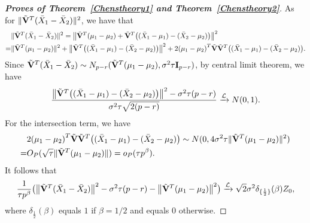 \documentclass[review]{elsarticle}
\theoremstyle{plain}
\theoremstyle{definition}
\theoremstyle{remark}
\begin{document}
\begin{proof}[\textbf{Proves of Theorem~\ref{Chenstheory1} and Theorem~\ref{Chenstheory2}}]
    As for $\|\tilde{\mathbf{V}}^T(\bar{X}_1-\bar{X}_2)\|^2$, we have that
        $$
        \begin{aligned}
            &\|\tilde{\mathbf{V}}^T(\bar{X}_1-\bar{X}_2)\|^2
            =\big\|\tilde{\mathbf{V}}^T(\mu_1-\mu_2)+\tilde{\mathbf{V}}^T\big((\bar{X}_1-\mu_1)-(\bar{X}_2-\mu_2)\big)\big\|^2\\
            =&\|\tilde{\mathbf{V}}^T(\mu_1-\mu_2)\|^2+
            \big\|\tilde{\mathbf{V}}^T\big((\bar{X}_1-\mu_1)-(\bar{X}_2-\mu_2)\big)\big\|^2+
            2{(\mu_1-\mu_2)}^T\tilde{\mathbf{V}}\tilde{\mathbf{V}}^T\big((\bar{X}_1-\mu_1)-(\bar{X}_2-\mu_2)\big).
        \end{aligned}
        $$
Since $\tilde{\mathbf{V}}^T (\bar{X}_1-\bar{X}_2)\sim N_{p-r}(\tilde{\mathbf{V}}^T (\mu_1-\mu_2),  \sigma^2 \tau \mathbf{I}_{p-r})$, by central limit theorem, we have
    $$
\frac{
    \big\|\tilde{\mathbf{V}}^T\big((\bar{X}_1-\mu_1)-(\bar{X}_2-\mu_2)\big)\big\|^2-\sigma^2 \tau (p-r)}{\sigma^2 \tau\sqrt{2(p-r)}}\xrightarrow{\mathcal{L}} N(0,1).
    $$
    For the intersection term, we have
    \begin{equation*}
        \begin{aligned}
            &2{(\mu_1-\mu_2)}^T\tilde{\mathbf{V}}\tilde{\mathbf{V}}^T\big((\bar{X}_1-\mu_1)-(\bar{X}_2-\mu_2)\big)
            \sim N(0,4\sigma^2 \tau \|\tilde{\mathbf{V}}^T(\mu_1-\mu_2)\|^2)\\
            =& O_P(\sqrt{\tau}\|\tilde{\mathbf{V}}^T(\mu_1-\mu_2)\| )=o_P(\tau p^{\beta}).
        \end{aligned}
    \end{equation*}
    It follows that
    \begin{equation}\label{eq:kkk3}
\frac{1}{\tau p^\beta}
    \big(\big\|\tilde{\mathbf{V}}^T(\bar{X}_1-\bar{X}_2)\big\|^2-\sigma^2 \tau (p-r)-\big\|\tilde{\mathbf{V}}^T(\mu_1-\mu_2)\big\|^2\big)
    \xrightarrow{\mathcal{L}} 
        \sqrt{2}\sigma^2 \delta_{\{\frac{1}{2}\}}(\beta)Z_0,
    \end{equation}
    where $\delta_{\frac{1}{2}}(\beta)$ equals $1$ if $\beta=1/2$ and equals $0$ otherwise.



\end{proof}
\end{document}

